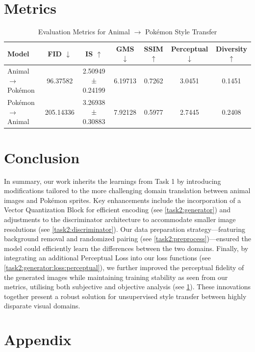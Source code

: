 \documentclass[twoside,english,notitlepage]{report}
\begin{document}
\section{Metrics}\label{task2:metrics}

\begin{table}[h]
    \centering
    \caption{Evaluation Metrics for Animal $\rightarrow$ Pokémon Style Transfer}
    \begin{tabular}{lcccccc}
        \hline
        \textbf{Model} & 
        \textbf{FID} $\downarrow$ & 
        \textbf{IS} $\uparrow$ & 
        \textbf{GMS} $\downarrow$ & 
        \textbf{SSIM} $\uparrow$ & 
        \textbf{Perceptual} $\downarrow$ & 
        \textbf{Diversity} $\uparrow$ \\
        \hline
        Animal $\rightarrow$ Pokémon    & 96.37582 & 2.50949 ± 0.24199 & 6.19713 & 0.7262 & 3.0451 & 0.1451 \\
        Pokémon $\rightarrow$ Animal       & 205.14336 & 3.26938 ± 0.30883 & 7.92128 & 0.5977 & 2.7445 & 0.2408 \\
        \hline
    \end{tabular}
    \label{tab:metrics}
\end{table}

\section{Conclusion}
In summary, our work inherits the learnings from Task 1 by introducing modifications tailored to the more challenging domain translation between animal images and Pokémon sprites. Key enhancements include the incorporation of a Vector Quantization Block for efficient encoding (see \ref{task2:generator}) and adjustments to the discriminator architecture to accommodate smaller image resolutions (see \ref{task2:discriminator}). Our data preparation strategy—featuring background removal and randomized pairing (see \ref{task2:preprocess})—ensured the model could efficiently learn the differences between the two domains. Finally, by integrating an additional Perceptual Loss into our loss functions (see \ref{task2:generator:loss:perceptual}), we further improved the perceptual fidelity of the generated images while maintaining training stability as seen from our metrics, utilising both subjective and objective analysis (see \ref{task2:metrics}). These innovations together present a robust solution for unsupervised style transfer between highly disparate visual domains.


\section{Appendix}
\end{document}
